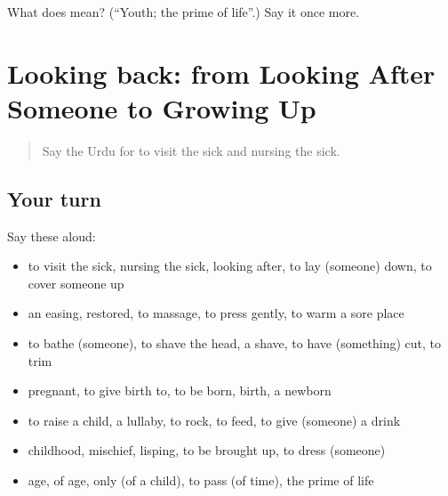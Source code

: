 \begin{tcolorbox}[breakable,colback=teal!4,colframe=teal!35!black,title={Before you move on}]
What does  mean? (\textquotedblleft{}Youth; the prime of life\textquotedblright{}.) Say it once more.
\end{tcolorbox}
\section[(dialogue)]{Looking back: from Looking After Someone to Growing Up}

\label{lesson:UR-R486-review-480-486}



\begin{quote}
Say the Urdu for to visit the sick and nursing the sick.
\end{quote}

\subsection*{Your turn}
Say these aloud:

\begin{itemize}
\raggedright
  \item to visit the sick, nursing the sick, looking after, to lay (someone) down, to cover someone up
  \item an easing, restored, to massage, to press gently, to warm a sore place
  \item to bathe (someone), to shave the head, a shave, to have (something) cut, to trim
  \item pregnant, to give birth to, to be born, birth, a newborn
  \item to raise a child, a lullaby, to rock, to feed, to give (someone) a drink
  \item childhood, mischief, lisping, to be brought up, to dress (someone)
  \item age, of age, only (of a child), to pass (of time), the prime of life
\end{itemize}

